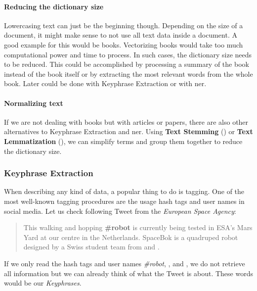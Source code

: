 \paragraph{Reducing the dictionary size}
Lowercasing text can just be the beginning though.
Depending on the size of a document, it might make sense to not use all text data inside a document.
A good example for this would be books.
Vectorizing books would take too much computational power and time to process.
In such cases, the dictionary size needs to be reduced.
This could be accomplished by processing a summary of the book instead of the book itself
or by extracting the most relevant words from the whole book.
Later could be done with Keyphrase Extraction or with \Gls{ner}.

\paragraph{Normalizing text}
If we are not dealing with books but with articles or papers,
there are also other alternatives to Keyphrase Extraction and \Gls{ner}.
Using \textbf{Text Stemming} ()
or \textbf{Text Lemmatization} (),
we can simplify terms and group them together to reduce
the dictionary size.

\subsubsection{Keyphrase Extraction}
\label{subsubsec:3_keyphrase_extraction}

When describing any kind of data, a popular thing to do is tagging.
One of the most well-known tagging procedures are the usage hash tags and user names in social media.
Let us check following Tweet from the \textit{European Space Agency}\cite{ESATweet}:

\begin{quotation}
    This walking and hopping \textbf{\#robot} is currently being tested in ESA’s Mars Yard
    at our \textbf{} centre in the Netherlands.
    SpaceBok is a quadruped robot designed by a Swiss student team from \textbf{}
    and \textbf{}.
\end{quotation}

If we only read the hash tags and user names \textit{\#robot}, \textit{},
\textit{} and \textit{},
we do not retrieve all information but we can already think of what the Tweet is about.
These words would be our \textit{Keyphrases}.

